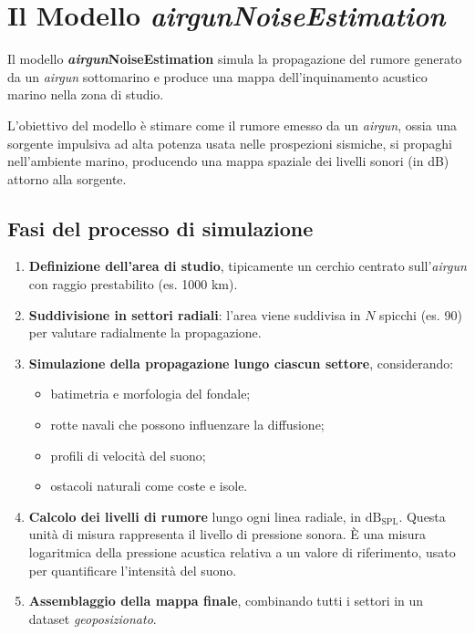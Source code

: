 \section{Il Modello \textit{\textit{airgun}NoiseEstimation}}

Il modello \textbf{\textit{airgun}NoiseEstimation} simula la propagazione del
rumore generato da un \textit{\textit{airgun}} sottomarino e produce una mappa dell'inquinamento
acustico marino nella zona di studio.

L'obiettivo del modello è stimare come il rumore emesso da un \textit{\textit{airgun}},
ossia una sorgente impulsiva ad alta potenza usata nelle prospezioni sismiche,
si propaghi nell'ambiente marino, producendo una mappa spaziale dei livelli sonori
(in dB) attorno alla sorgente.

\subsection{Fasi del processo di simulazione}

\begin{enumerate}
  \item \textbf{Definizione dell'area di studio}, tipicamente un cerchio centrato
    sull'\textit{\textit{airgun}} con raggio prestabilito (es. 1000 km).

  \item \textbf{Suddivisione in settori radiali}: l'area viene suddivisa in $N$ spicchi
    (es. 90) per valutare radialmente la propagazione.

  \item \textbf{Simulazione della propagazione lungo ciascun settore}, considerando:
    \begin{itemize}
      \item batimetria e morfologia del fondale;

      \item rotte navali che possono influenzare la diffusione;

      \item profili di velocità del suono;

      \item ostacoli naturali come coste e isole.
    \end{itemize}

  \item \textbf{Calcolo dei livelli di rumore} lungo ogni linea radiale, in $\mathrm{dB_{SPL}}$.
    Questa unità di misura rappresenta il livello di pressione sonora. È una misura
    logaritmica della pressione acustica relativa a un valore di riferimento,
    usato per quantificare l'intensità del suono. \cite{db-spl-definition}

  \item \textbf{Assemblaggio della mappa finale}, combinando tutti i settori in un
    dataset \textit{geoposizionato}.
\end{enumerate}

